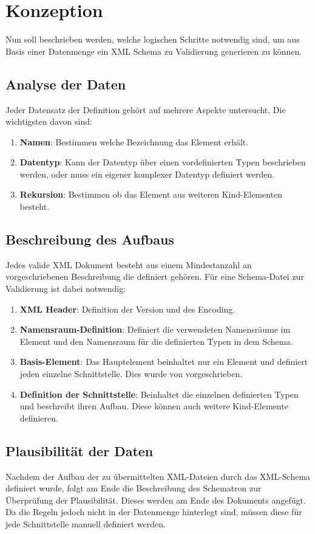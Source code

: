 \chapter{Konzeption}
\label{cha:Konzeption}
Nun soll beschrieben werden, welche logischen Schritte notwendig sind, um aus Basis einer Datenmenge ein XML Schema zu Validierung generieren zu können.

\section{Analyse der Daten}
Jeder Datensatz der Definition gehört auf mehrere Aspekte untersucht.
Die wichtigsten davon sind:

\begin{enumerate}
\item \textbf{Namen}: Bestimmen welche Bezeichnung das Element erhält.
\item \textbf{Datentyp}: Kann der Datentyp über einen vordefinierten Typen beschrieben werden, oder muss ein eigener komplexer Datentyp definiert werden. 
\item \textbf{Rekursion}: Bestimmen ob das Element aus weiteren Kind-Elementen besteht. 
\end{enumerate}

\section{Beschreibung des Aufbaus}
Jedes valide XML Dokument besteht aus einem Mindestanzahl an vorgeschriebenen Beschreibung die definiert gehören.
Für eine Schema-Datei zur Validierung ist dabei notwendig:

\begin{enumerate}
\item \textbf{XML Header}: Definition der Version und des Encoding.
\item \textbf{Namensraum-Definition}: Definiert die verwendeten Namensräume im Element und den Namensraum für die definierten Typen in dem Schema.
\item \textbf{Basis-Element}: Das Hauptelement beinhaltet nur ein Element und definiert jeden einzelne Schnittstelle. Dies wurde von \BMD vorgeschrieben.
\item \textbf{Definition der Schnittstelle}: Beinhaltet die einzelnen definierten Typen und beschreibt ihren Aufbau. Diese können auch weitere Kind-Elemente definieren.
\end{enumerate}

\section{Plausibilität der Daten}
Nachdem der Aufbau der zu übermittelten XML-Dateien durch das XML-Schema definiert wurde, folgt am Ende die Beschreibung des Schematron zur Überprüfung der Plausibilität.
Dieses werden am Ende des Dokuments angefügt. Da die Regeln jedoch nicht in der Datenmenge hinterlegt sind, müssen diese für jede Schnittstelle manuell definiert werden.
